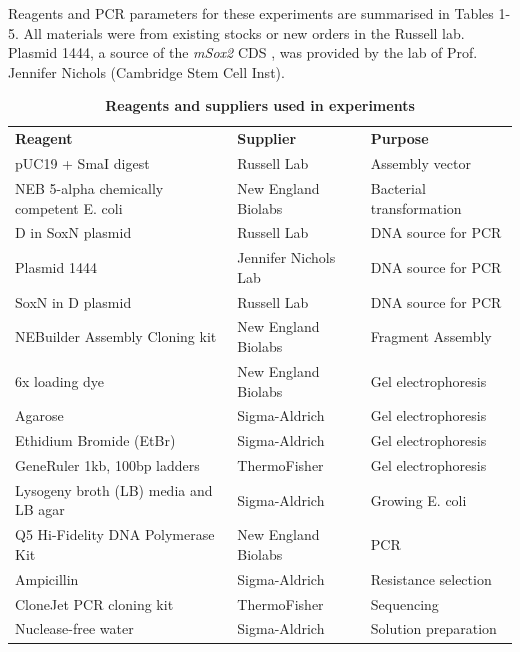 \documentclass[withindex,glossary]{cam-thesis}
\begin{document}
Reagents and PCR parameters for these experiments are summarised in
Tables 1-5. All materials were from existing stocks or new orders in the
Russell lab. Plasmid 1444, a source of the \emph{mSox2} CDS , was
provided by the lab of Prof. Jennifer Nichols (Cambridge Stem Cell
Inst).

\begin{table}[htbp]
\centering
\begin{adjustbox}{width=\textwidth, center=\textwidth}
\begin{tabular}{@{}lll@{}}
\rowcolor{thead}
{\color{headtext} \textbf{Reagent}}                         & {\color{headtext} \textbf{Supplier}}    & {\color{headtext} \textbf{Purpose}}         \\
pUC19 + SmaI digest                      & Russell Lab          & Assembly vector          \\
NEB 5-alpha chemically competent E. coli & New England Biolabs  & Bacterial transformation \\
D in SoxN plasmid                        & Russell Lab          & DNA source for PCR       \\
Plasmid 1444                             & Jennifer Nichols Lab & DNA source for PCR       \\
SoxN in D plasmid                        & Russell Lab          & DNA source for PCR       \\
NEBuilder Assembly Cloning kit           & New England Biolabs  & Fragment Assembly        \\
6x loading dye                           & New England Biolabs  & Gel electrophoresis      \\
Agarose                                  & Sigma-Aldrich        & Gel electrophoresis      \\
Ethidium Bromide (EtBr)                  & Sigma-Aldrich        & Gel electrophoresis      \\
GeneRuler 1kb, 100bp ladders             & ThermoFisher         & Gel electrophoresis      \\
Lysogeny broth (\gls{LB}) media and LB agar    & Sigma-Aldrich        & Growing E. coli          \\
Q5 Hi-Fidelity DNA Polymerase Kit        & New England Biolabs  & PCR                      \\
Ampicillin                               & Sigma-Aldrich        & Resistance selection     \\
CloneJet PCR cloning kit                 & ThermoFisher         & Sequencing               \\
Nuclease-free water                      & Sigma-Aldrich        & Solution preparation     \\ \bottomrule
\end{tabular}
\end{adjustbox}
\caption{\textbf{Reagents and suppliers used in experiments}}
\end{table}
\end{document}
